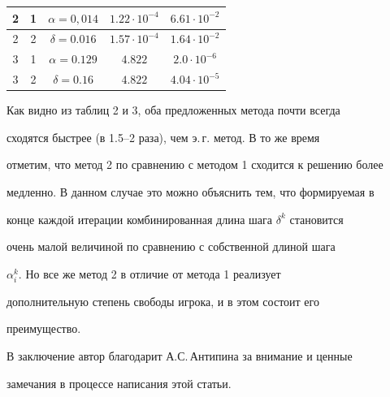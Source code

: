 {\begin{center}
\begin{tabular}{|c|c|c|c|c|}
2 & 1 & $\alpha=0,014$ & $1.22\cdot10^{-4}$ & $6.61\cdot10^{-2}$\\ 


\hline 


2 & 2 & $\delta=0.016$ & $1.57\cdot10^{-4}$ & $1.64\cdot10^{-2}$\\ 


\hline 


3 & 1 & $\alpha=0.129$ & $4.822$ & $2.0\cdot10^{-6}$\\ 


\hline 


3 & 2 & $\delta=0.16$ & $4.822$ & $4.04\cdot10^{-5}$\\ 


\hline 


\end{tabular} 


\end{center} 


} 


\smallskip 


 


Как видно из таблиц 2 и 3, оба предложенных метода почти всегда 


сходятся быстрее (в 1.5--2 раза), чем э.\,г. метод. В то же время 


отметим, что метод 2 по сравнению с методом 1 сходится к решению более 


медленно. В данном случае это можно объяснить тем, что формируемая в 


конце каждой итерации комбинированная длина шага $\delta^k$ становится 


очень малой величиной по сравнению с собственной длиной шага 


$\alpha^k_i$. Но все же метод 2 в отличие от метода 1 реализует 


дополнительную степень свободы игрока, и в этом состоит его 


преимущество. 


 


В заключение автор благодарит А.С.\,Антипина за внимание и ценные 


замечания в процессе написания этой статьи. 


 


